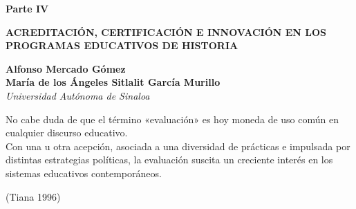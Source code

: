 %
\markboth{}{}
\thispagestyle{empty}
\phantom{abc}

\vspace{0.35\textheight}
{\centering \bfseries Parte IV\par}
{\centering \bfseries ACREDITACIÓN, CERTIFICACIÓN E INNOVACIÓN EN LOS 
PROGRAMAS EDUCATIVOS DE HISTORIA \par}
\markboth{}{}
\thispagestyle{empty}	
\cleardoublepage{}

\thispagestyle{empty}
{\par}
\setcounter{footnote}{0}

\bigskip
\begin{center}
{\bfseries Alfonso Mercado Gómez\\
María de los Ángeles Sitlalit García Murillo}\\
{\itshape Universidad Autónoma de Sinaloa}
\end{center}

\epigraph{No cabe duda de que el término
«evaluación» es hoy moneda de uso común en cualquier discurso educativo.\\
Con una u otra acepción, asociada a una diversidad de prácticas e
impulsada por distintas estrategias políticas,
la evaluación suscita un creciente interés en los sistemas
educativos contemporáneos.}{(Tiana 1996)}


